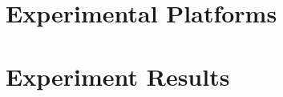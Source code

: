 \documentclass[letterpaper, 10 pt, conference]{ieeeconf}
\DeclareMathOperator*{\argmin}{arg\,min}
\begin{document}
%
%
%

\section{Experimental Platforms} \label{section:Experimental Platforms}

%
%
%

\section{Experiment Results}
\end{document}
